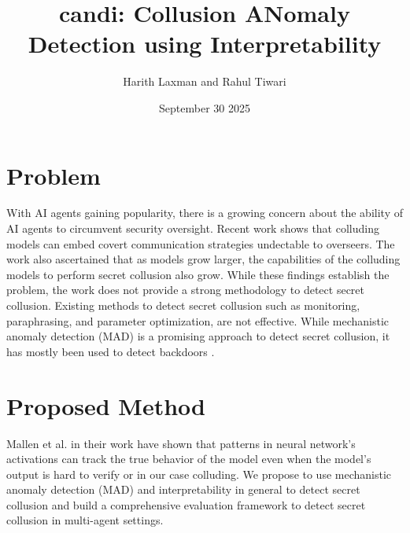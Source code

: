 \documentclass{article}
\title{candi: Collusion ANomaly Detection using Interpretability}
\author{Harith Laxman and Rahul Tiwari}
\date{September 30 2025}
\begin{document}
\maketitle



\section{Problem}

With AI agents gaining popularity, there is a growing concern about the ability of AI agents to circumvent security oversight.
Recent work \cite{motwani2024secret} shows that colluding models can embed covert communication strategies undectable to overseers.
The work also ascertained that as models grow larger, the capabilities of the colluding models to perform secret collusion also grow.
While these findings establish the problem, the work does not provide a strong methodology to detect secret collusion.
Existing methods to detect secret collusion such as monitoring, paraphrasing, and parameter optimization, are not effective.
While mechanistic anomaly detection (MAD) is a promising approach to detect secret collusion, it has mostly been used to detect backdoors \cite{jenner2024gentle}.

\section{Proposed Method}

Mallen et al. \cite{mallen2023eliciting} in their work have shown that patterns in neural network's activations can track the true
behavior of the model even when the model's output is hard to verify or in our case colluding.
We propose to use mechanistic anomaly detection (MAD) and interpretability in general to detect secret collusion
and build a comprehensive evaluation framework to detect secret collusion in multi-agent settings.
\end{document}
